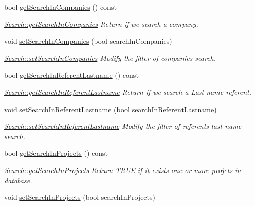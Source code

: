 \begin{DoxyCompactItemize}
bool \hyperlink{classModels_1_1Search_ad38428f4aa81ba5951f82e0fcb92779c}{get\-Search\-In\-Companies} () const 
\begin{DoxyCompactList}\small\item\em \hyperlink{classModels_1_1Search_ad38428f4aa81ba5951f82e0fcb92779c}{Search\-::get\-Search\-In\-Companies} Return if we search a company. \end{DoxyCompactList}\item 
void \hyperlink{classModels_1_1Search_a3a630b2b2a48fb013b4c8cb9756fa813}{set\-Search\-In\-Companies} (bool search\-In\-Companies)
\begin{DoxyCompactList}\small\item\em \hyperlink{classModels_1_1Search_a3a630b2b2a48fb013b4c8cb9756fa813}{Search\-::set\-Search\-In\-Companies} Modify the filter of companies search. \end{DoxyCompactList}\item 
bool \hyperlink{classModels_1_1Search_aa415bcd966fef7bcd1cd5bd3373d57f6}{get\-Search\-In\-Referent\-Lastname} () const 
\begin{DoxyCompactList}\small\item\em \hyperlink{classModels_1_1Search_aa415bcd966fef7bcd1cd5bd3373d57f6}{Search\-::get\-Search\-In\-Referent\-Lastname} Return if we search a Last name referent. \end{DoxyCompactList}\item 
void \hyperlink{classModels_1_1Search_a4a897b3e19a0a6ce9e37ae1a73b39240}{set\-Search\-In\-Referent\-Lastname} (bool search\-In\-Referent\-Lastname)
\begin{DoxyCompactList}\small\item\em \hyperlink{classModels_1_1Search_a4a897b3e19a0a6ce9e37ae1a73b39240}{Search\-::set\-Search\-In\-Referent\-Lastname} Modify the filter of referents last name search. \end{DoxyCompactList}\item 
bool \hyperlink{classModels_1_1Search_a6c8f401bb696db96cc57a635d46910dd}{get\-Search\-In\-Projects} () const 
\begin{DoxyCompactList}\small\item\em \hyperlink{classModels_1_1Search_a6c8f401bb696db96cc57a635d46910dd}{Search\-::get\-Search\-In\-Projects} Return T\-R\-U\-E if it exists one or more projets in database. \end{DoxyCompactList}\item 
void \hyperlink{classModels_1_1Search_ab84375da3e302c7a871b4ced1c8d69c3}{set\-Search\-In\-Projects} (bool search\-In\-Projects)

\end{DoxyCompactItemize}
